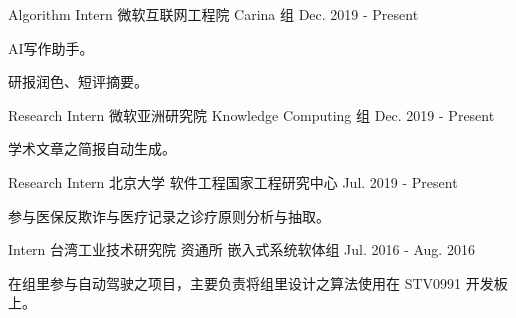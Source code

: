 

\begin{cventries}

  \cventry
    {Algorithm Intern} %
    {微软互联网工程院 Carina 组} %
    {} %
    {Dec. 2019 - Present} %
    {
      \begin{cvitems} %
        \item {AI写作助手。}
        \item {研报润色、短评摘要。}
      \end{cvitems}
    }

  \cventry
    {Research Intern} %
    {微软亚洲研究院 Knowledge Computing 组} %
    {} %
    {Dec. 2019 - Present} %
    {
      \begin{cvitems} %
        \item {学术文章之简报自动生成。}
      \end{cvitems}
    }

  \cventry
    {Research Intern} %
    {北京大学 软件工程国家工程研究中心} %
    {} %
    {Jul. 2019 - Present} %
    {
      \begin{cvitems} %
        \item {参与医保反欺诈与医疗记录之诊疗原则分析与抽取。}
      \end{cvitems}
    }

  \cventry
    {Intern} %
    {台湾工业技术研究院 资通所 嵌入式系统软体组} %
    {} %
    {Jul. 2016 - Aug. 2016} %
    {
      \begin{cvitems} %
        \item {在组里参与自动驾驶之项目，主要负责将组里设计之算法使用在 STV0991 开发板上。}
      \end{cvitems}
    }

\end{cventries}
